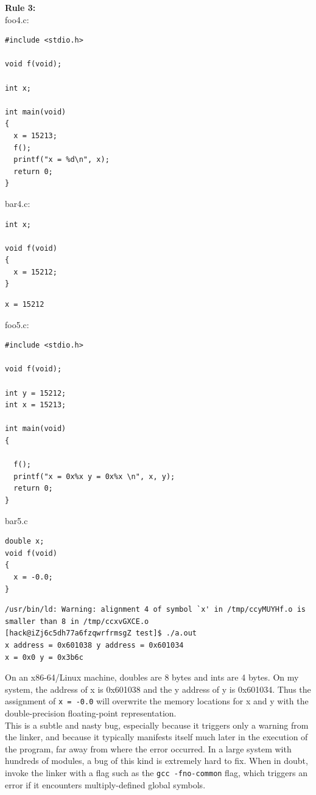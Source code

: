 \documentclass[11pt]{article}
\begin{document}
\textbf{Rule 3:}\\
foo4.c:\\
\begin{verbatim}
#include <stdio.h>

void f(void);

int x;

int main(void)
{
  x = 15213;
  f();
  printf("x = %d\n", x);
  return 0;
}

\end{verbatim}

bar4.c:\\
\begin{verbatim}
int x;

void f(void)
{
  x = 15212;
}

\end{verbatim}

\begin{verbatim}
x = 15212
\end{verbatim}

foo5.c:\\
\begin{verbatim}
#include <stdio.h>

void f(void);

int y = 15212;
int x = 15213;

int main(void)
{

  f();
  printf("x = 0x%x y = 0x%x \n", x, y);
  return 0;
}

\end{verbatim}

bar5.c\\
\begin{verbatim}
double x;
void f(void)
{
  x = -0.0;
}

\end{verbatim}

\begin{verbatim}
/usr/bin/ld: Warning: alignment 4 of symbol `x' in /tmp/ccyMUYHf.o is smaller than 8 in /tmp/ccxvGXCE.o
[hack@iZj6c5dh77a6fzqwrfrmsgZ test]$ ./a.out 
x address = 0x601038 y address = 0x601034 
x = 0x0 y = 0x3b6c 
\end{verbatim}
On an x86-64/Linux machine, doubles are 8 bytes and ints are 4 bytes. On my system, the address of x is 0x601038 and the y address of y is 0x601034. Thus the assignment of \texttt{x = -0.0} will overwrite the memory locations for x and y with the double-precision floating-point representation.\\


This is a subtle and nasty bug, especially because it triggers only a warning from the linker, and because it typically manifests itself much later in the execution of the program, far away from where the error occurred. In a large system with hundreds of modules, a bug of this kind is extremely hard to fix. When in doubt, invoke the linker with a flag such as the \texttt{gcc -fno-common} flag, which triggers an error if it encounters multiply-defined global symbols.\\
\end{document}
